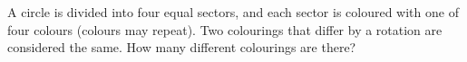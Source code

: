 A circle is divided into four equal sectors, and each sector is coloured with one of four colours (colours may repeat). Two colourings that differ by a rotation are considered the same. How many different colourings are there?
